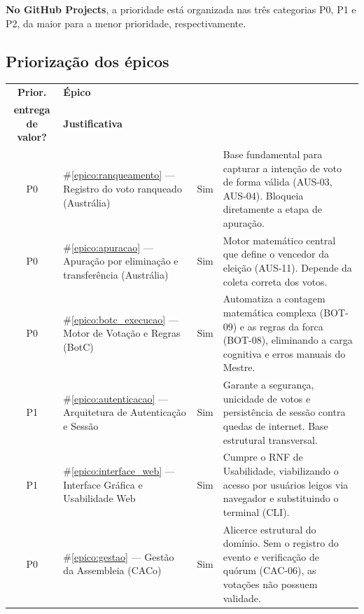 \documentclass[12pt,a4paper]{article}
\newcounter{epico}
\begin{document}
\textbf{No GitHub Projects}, a prioridade está organizada nas três categorias P0, P1 e P2, da maior para a menor prioridade, respectivamente.

\subsection{Priorização dos épicos}

\begin{table}[H]
\centering
\small
\begin{tabular}{|c|m{3.4cm}|c|m{6.7cm}|}
\hline
\rowcolor[gray]{0.9}
\textbf{Prior.} &
\textbf{Épico} &
\makecell{\textbf{Incluído na primeira}\\
\textbf{entrega de valor?}} &
\textbf{Justificativa} \\
\hline

P0 & 
\#\ref{epico:ranqueamento} --- Registro do voto ranqueado (Austrália) & 
Sim & 
Base fundamental para capturar a intenção de voto de forma válida (AUS-03, AUS-04). Bloqueia diretamente a etapa de apuração. \\
\hline

P0 & 
\#\ref{epico:apuracao} --- Apuração por eliminação e transferência (Austrália) & 
Sim & 
Motor matemático central que define o vencedor da eleição (AUS-11). Depende da coleta correta dos votos. \\
\hline

P0 & 
\#\ref{epico:botc_execucao} --- Motor de Votação e Regras (BotC) & 
Sim & 
Automatiza a contagem matemática complexa (BOT-09) e as regras da forca (BOT-08), eliminando a carga cognitiva e erros manuais do Mestre. \\
\hline

P1 & 
\#\ref{epico:autenticacao} --- Arquitetura de Autenticação e Sessão & 
Sim & 
Garante a segurança, unicidade de votos e persistência de sessão contra quedas de internet. Base estrutural transversal. \\
\hline

P1 & 
\#\ref{epico:interface_web} --- Interface Gráfica e Usabilidade Web & 
Sim & 
Cumpre o RNF de Usabilidade, viabilizando o acesso por usuários leigos via navegador e substituindo o terminal (CLI). \\
\hline

P0 & 
\#\ref{epico:gestao} --- Gestão da Assembleia (CACo) & 
Sim & 
Alicerce estrutural do domínio. Sem o registro do evento e verificação de quórum (CAC-06), as votações não possuem validade. \\
\hline


\end{tabular}
\end{table}
\end{document}
